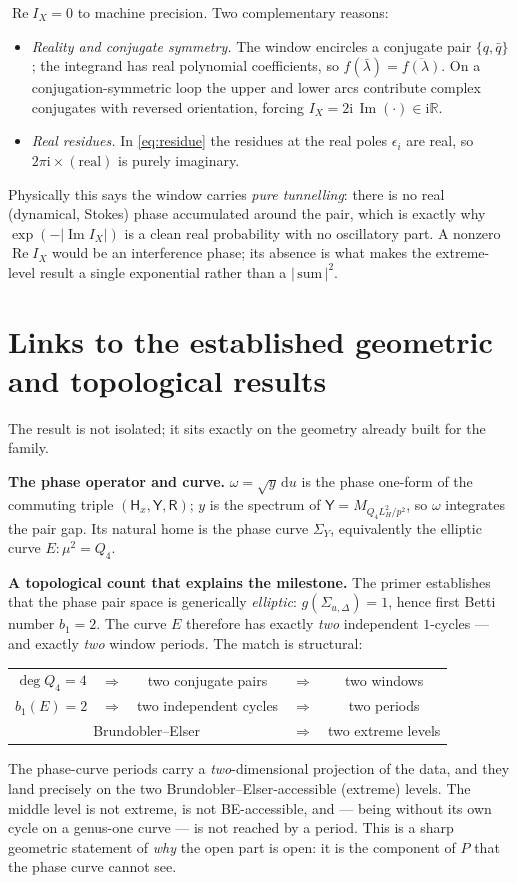 \documentclass[11pt]{article}
\newcommand{\R}{\mathbb R}
\newcommand{\ii}{\mathrm i}
\newcommand{\dd}{\mathrm d}
\newcommand{\Yop}{\mathsf Y}
\newcommand{\Rop}{\mathsf R}
\newcommand{\Hx}{\mathsf H_x}
\newcommand{\im}{\operatorname{Im}}
\newcommand{\re}{\operatorname{Re}}
\begin{document}
$\re I_X=0$ to machine precision. Two complementary reasons:
\begin{itemize}
 \item \emph{Reality and conjugate symmetry.} The window encircles a
 conjugate pair $\{q,\bar q\}$; the integrand has real polynomial coefficients,
 so $f(\bar\lambda)=\overline{f(\lambda)}$. On a conjugation-symmetric loop the
 upper and lower arcs contribute complex conjugates with reversed orientation,
 forcing $I_X=2\ii\,\im(\cdot)\in\ii\R$.
 \item \emph{Real residues.} In \eqref{eq:residue} the residues at the real
 poles $\epsilon_i$ are real, so $2\pi\ii\times(\text{real})$ is purely
 imaginary.
\end{itemize}
Physically this says the window carries \emph{pure tunnelling}: there is no real
(dynamical, Stokes) phase accumulated around the pair, which is exactly why
$\exp(-|\im I_X|)$ is a clean real probability with no oscillatory part. A
nonzero $\re I_X$ would be an interference phase; its absence is what makes the
extreme-level result a single exponential rather than a $|\,\text{sum}\,|^2$.

\section{Links to the established geometric and topological results}

The result is not isolated; it sits exactly on the geometry already built for
the family.

\textbf{The phase operator and curve.} $\omega=\sqrt y\,\dd u$ is the phase
one-form of the commuting triple $(\Hx,\Yop,\Rop)$; $y$ is the spectrum of
$\Yop=M_{Q_4L_H^2/p^2}$, so $\omega$ integrates the pair gap. Its natural home
is the phase curve $\Sigma_Y$, equivalently the elliptic curve $E:\mu^2=Q_4$.

\textbf{A topological count that explains the milestone.} The primer establishes
that the phase pair space is generically \emph{elliptic}: $g(\Sigma_{u,\Delta})
=1$, hence first Betti number $b_1=2$. The curve $E$ therefore has exactly
\emph{two} independent $1$-cycles --- and exactly \emph{two} window periods. The
match is structural:
\begin{center}
\begin{tabular}{ccccc}
\toprule
$\deg Q_4=4$ & $\Rightarrow$ & two conjugate pairs & $\Rightarrow$ & two windows\\
$b_1(E)=2$   & $\Rightarrow$ & two independent cycles & $\Rightarrow$ & two periods\\
\multicolumn{3}{c}{Brundobler--Elser} & $\Rightarrow$ & two extreme levels\\
\bottomrule
\end{tabular}
\end{center}
The phase-curve periods carry a \emph{two}-dimensional projection of the data,
and they land precisely on the two Brundobler--Elser-accessible (extreme)
levels. The middle level is not extreme, is not BE-accessible, and --- being
without its own cycle on a genus-one curve --- is not reached by a period. This
is a sharp geometric statement of \emph{why} the open part is open: it is the
component of $P$ that the phase curve cannot see.
\end{document}
